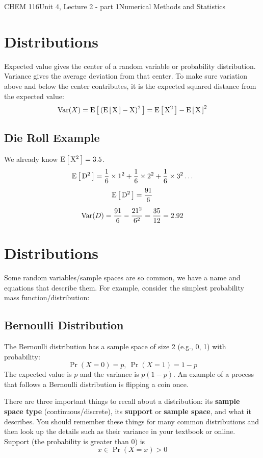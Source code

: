 \documentclass{article}
\begin{document}
\begin{tdoc}{CHEM 116}{Unit 4, Lecture 2 - part 1}{Numerical Methods and Statistics}

  \section{Distributions}

Expected value gives the center of a random variable or probability
distribution. Variance gives the average deviation from that
center. To make sure variation above and below the center contributes,
it is the expected squared distance from the expected value:
\begin{equation}
\operatorname{Var}(X) = \rm{E}\left[\,(\rm{E}\left[\,X\,\right] - X)^2\,\right] = \rm{E}\left[\,X^2\,\right] - \rm{E}\left[\,X\,\right]^2
\end{equation}

\subsection{Die Roll Example}
We already know $\rm{E}\left[\,X^2\,\right] = 3.5$.
\[
\rm{E}\left[\,D^2\,\right] = \frac{1}{6}\times{}1^2 + \frac{1}{6}\times{}2^2 + \frac{1}{6}\times{}3^2 \ldots
\]
\[
\rm{E}\left[\,D^2\,\right] = \frac{91}{6}
\]
\[
\operatorname{Var}(D) = \frac{91}{6} - \frac{21^2}{6^2} = \frac{35}{12} = 2.92
\]

\section{Distributions}

Some random variables/sample spaces are so common, we have a name and
equations that describe them. For example, consider the simplest
probability mass function/distribution:

\subsection{Bernoulli Distribution} 

The Bernoulli distribution has a sample space of size 2 (e.g., 0, 1) with probability:
\begin{equation}
\Pr(X = 0) = p,\: \Pr(X = 1) = 1 - p
\end{equation}
The expected value is $p$ and the variance is $p(1-p)$. An example of
a process that follows a Bernoulli distribution is flipping a coin
once.

There are three important things to recall about a distribution: its
{\bf sample space type} (continuous/discrete), its {\bf support} or
{\bf sample space}, and what it describes. You should remember these
things for many common distributions and then look up the details such
as their variance in your textbook or online. Support (the probability
is greater than $0$) is
\begin{equation}
x \in \Pr(X = x) > 0
\end{equation}



\end{tdoc}
\end{document}
